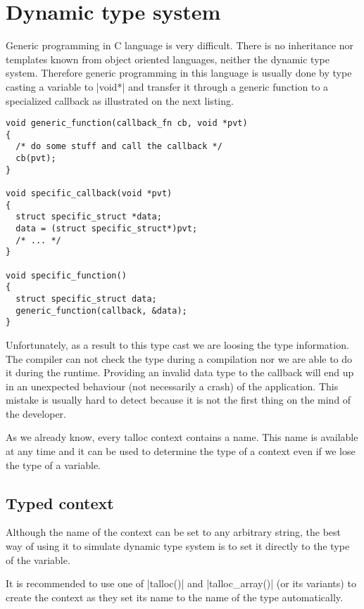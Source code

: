\section{Dynamic type system}
\label{talloc:dyn-ts}

Generic programming in C language is very difficult. There is no inheritance nor
templates known from object oriented languages, neither the dynamic type system.
Therefore generic programming in this language is usually done by type casting a
variable to |void*| and transfer it through a generic function to a specialized
callback as illustrated on the next listing.

\begin{lstlisting}[caption={Generic programming pattern},label=lst-generic-prg]
void generic_function(callback_fn cb, void *pvt)
{
  /* do some stuff and call the callback */
  cb(pvt);
}

void specific_callback(void *pvt)
{
  struct specific_struct *data;
  data = (struct specific_struct*)pvt;
  /* ... */
}

void specific_function()
{
  struct specific_struct data;
  generic_function(callback, &data);
}
\end{lstlisting}

Unfortunately, as a result to this type cast we are loosing the type
information. The compiler can not check the type during a compilation nor we are
able to do it during the runtime. Providing an invalid data type to the
callback will end up in an unexpected behaviour (not necessarily a crash) of
the application. This mistake is usually hard to detect because it is not the
first thing on the mind of the developer.

As we already know, every talloc context contains a name. This name is available
at any time and it can be used to determine the type of a context even if we
lose the type of a variable.

\subsection{Typed context}

Although the name of the context can be set to any arbitrary string, the best
way of using it to simulate dynamic type system is to set it directly to the
type of the variable.

It is recommended to use one of |talloc()| and |talloc_array()| (or its
variants) to create the context as they set its name to the name of the type
automatically.

